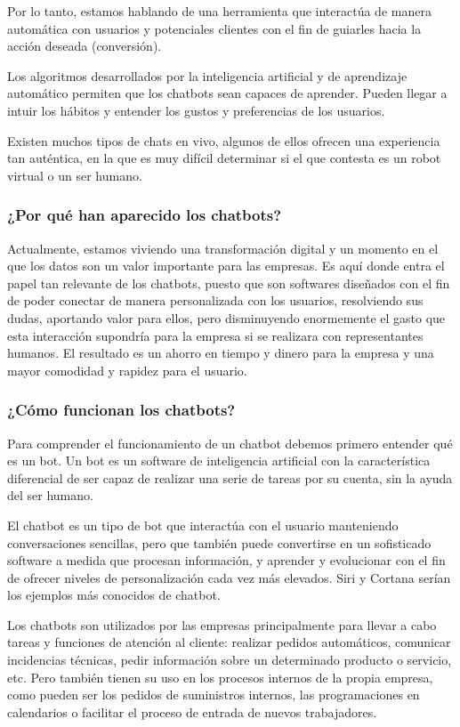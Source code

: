 Por lo tanto, estamos hablando de una herramienta que interactúa de manera automática con usuarios y potenciales clientes con el fin de guiarles hacia la acción deseada (conversión).

Los algoritmos desarrollados por la inteligencia artificial y de aprendizaje automático permiten que los chatbots sean capaces de aprender. Pueden llegar a intuir los hábitos y entender los gustos y preferencias de los usuarios.

Existen muchos tipos de chats en vivo, algunos de ellos ofrecen una experiencia tan auténtica, en la que es muy difícil determinar si el que contesta es un robot virtual o un ser humano.

\subsubsection{¿Por qué han aparecido los chatbots?}

Actualmente, estamos viviendo una transformación digital y un momento en el que los datos son un valor importante para las empresas. Es aquí donde entra el papel tan relevante de los chatbots, puesto que son softwares diseñados con el fin de poder conectar de manera personalizada con los usuarios, resolviendo sus dudas, aportando valor para ellos, pero disminuyendo enormemente el gasto que esta interacción supondría para la empresa si se realizara con representantes humanos. El resultado es un ahorro en tiempo y dinero para la empresa y una mayor comodidad y rapidez para el usuario.

\subsubsection{¿Cómo funcionan los chatbots?}

Para comprender el funcionamiento de un chatbot debemos primero entender qué es un bot. Un bot es un software de inteligencia artificial con la característica diferencial de ser capaz de realizar una serie de tareas por su cuenta, sin la ayuda del ser humano. 

El chatbot es un tipo de bot que interactúa con el usuario manteniendo conversaciones sencillas, pero que también puede convertirse en un sofisticado software a medida que procesan información, y aprender y evolucionar con el fin de ofrecer niveles de personalización cada vez más elevados. Siri y Cortana serían los ejemplos más conocidos de chatbot.

Los chatbots son utilizados por las empresas principalmente para llevar a cabo tareas y funciones de atención al cliente: realizar pedidos automáticos, comunicar incidencias técnicas, pedir información sobre un determinado producto o servicio, etc. Pero también tienen su uso en los procesos internos de la propia empresa, como pueden ser los pedidos de suministros internos, las programaciones en calendarios o facilitar el proceso de entrada de nuevos trabajadores.

